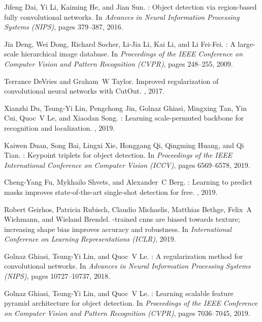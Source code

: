 \documentclass[10pt,twocolumn,letterpaper]{article}
\begin{document}
{\begin{thebibliography}{100}
	Jifeng Dai, Yi Li, Kaiming He, and Jian Sun.
	: Object detection via region-based fully convolutional
	networks.
	\newblock In {\em Advances in Neural Information Processing Systems (NIPS)},
	pages 379--387, 2016.
	
	Jia Deng, Wei Dong, Richard Socher, Li-Jia Li, Kai Li, and Li Fei-Fei.
	: A large-scale hierarchical image database.
	\newblock In {\em Proceedings of the IEEE Conference on Computer Vision and
		Pattern Recognition (CVPR)}, pages 248--255, 2009.
	
	Terrance DeVries and Graham~W Taylor.
	\newblock Improved regularization of convolutional neural networks with
	{CutOut}.
	, 2017.
	
	Xianzhi Du, Tsung-Yi Lin, Pengchong Jin, Golnaz Ghiasi, Mingxing Tan, Yin Cui,
	Quoc~V Le, and Xiaodan Song.
	: Learning scale-permuted backbone for recognition and
	localization.
	, 2019.
	
	Kaiwen Duan, Song Bai, Lingxi Xie, Honggang Qi, Qingming Huang, and Qi Tian.
	: Keypoint triplets for object detection.
	\newblock In {\em Proceedings of the IEEE International Conference on Computer
		Vision (ICCV)}, pages 6569--6578, 2019.
	
	Cheng-Yang Fu, Mykhailo Shvets, and Alexander~C Berg.
	: Learning to predict masks improves state-of-the-art
	single-shot detection for free.
	, 2019.
	
	Robert Geirhos, Patricia Rubisch, Claudio Michaelis, Matthias Bethge, Felix~A
	Wichmann, and Wieland Brendel.
	-trained cnns are biased towards texture; increasing shape
	bias improves accuracy and robustness.
	\newblock In {\em International Conference on Learning Representations (ICLR)},
	2019.
	
	Golnaz Ghiasi, Tsung-Yi Lin, and Quoc~V Le.
	: A regularization method for convolutional networks.
	\newblock In {\em Advances in Neural Information Processing Systems (NIPS)},
	pages 10727--10737, 2018.
	
	Golnaz Ghiasi, Tsung-Yi Lin, and Quoc~V Le.
	: Learning scalable feature pyramid architecture for object
	detection.
	\newblock In {\em Proceedings of the IEEE Conference on Computer Vision and
		Pattern Recognition (CVPR)}, pages 7036--7045, 2019.
	

\end{thebibliography}}
\end{document}
